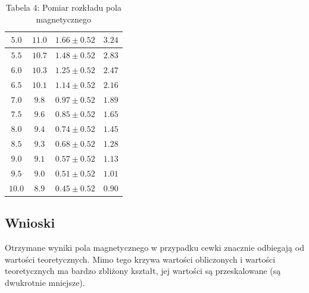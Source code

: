 \documentclass{fizykalab}
\begin{document}
{{{\begin{table}[H]
\begin{tabular}{|c|c|c|c|}
		$5.0$                     & $11.0$                   & $1.66 \pm 0.52$           & $3.24$                                  \\ \hline
		$5.5$                     & $10.7$                   & $1.48 \pm 0.52$           & $2.83$                                  \\ \hline
		$6.0$                     & $10.3$                   & $1.25 \pm 0.52$           & $2.47$                                  \\ \hline
		$6.5$                     & $10.1$                   & $1.14 \pm 0.52$           & $2.16$                                  \\ \hline
		$7.0$                     & $9.8$                    & $0.97 \pm 0.52$           & $1.89$                                  \\ \hline
		$7.5$                     & $9.6$                    & $0.85 \pm 0.52$           & $1.65$                                  \\ \hline
		$8.0$                     & $9.4$                    & $0.74 \pm 0.52$           & $1.45$                                  \\ \hline
		$8.5$                     & $9.3$                    & $0.68 \pm 0.52$           & $1.28$                                  \\ \hline
		$9.0$                     & $9.1$                    & $0.57 \pm 0.52$           & $1.13$                                  \\ \hline
		$9.5$                     & $9.0$                    & $0.51 \pm 0.52$           & $1.01$                                  \\ \hline
		$10.0$                    & $8.9$                    & $0.45 \pm 0.52$           & $0.90$                                  \\ \hline
	\end{tabular}
	\caption*{Tabela 4: Pomiar rozkładu pola magnetycznego}
\end{table}

\subsection*{Wnioski}
\par
Otrzymane wyniki pola magnetycznego w przypadku cewki znacznie odbiegają od wartości teoretycznych. 
Mimo tego krzywa wartości obliczonych i wartości teoretycznych ma bardzo zbliżony kształt, jej wartości są przeskalowane (są dwukrotnie mniejsze).

}}}
\end{document}
